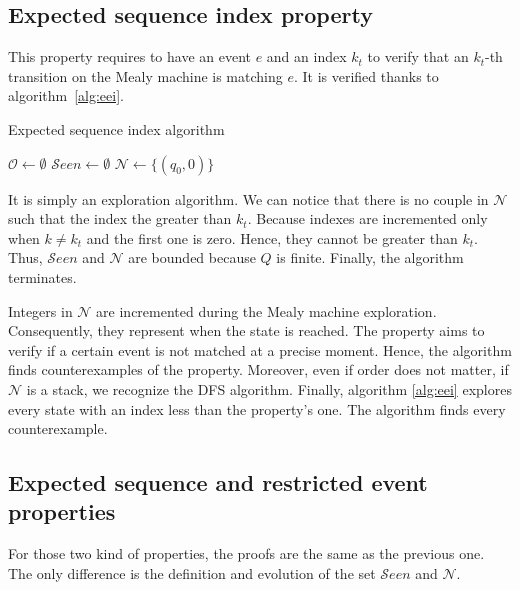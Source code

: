 \subsection{Expected sequence index property}
This property requires to have an event $e$ and an index $k_t$ to verify that an $k_t$-th transition on the Mealy machine is matching $e$.
It is verified thanks to algorithm~\ref*{alg:eei}.
\begin{algorithm}
    \caption{Expected sequence index algorithm}\label{alg:eei}
    $\mathcal{O}\gets \emptyset$\;
    $\mathcal{S}een\gets \emptyset$\;
    $\mathcal{N}\gets \{(q_0,0) \} $\;
\end{algorithm}

It is simply an exploration algorithm. 
We can notice that there is no couple in $\mathcal{N}$ such that the index the greater than $k_t$.
Because indexes are incremented only when $k\neq k_t$ and the first one is zero.
Hence, they cannot be greater than $k_t$. 
Thus, $\mathcal{S}een$ and $\mathcal{N}$ are bounded because $Q$ is finite.
Finally, the algorithm terminates.

Integers in $\mathcal{N}$ are incremented during the Mealy machine exploration.
Consequently, they represent when the state is reached. 
The property aims to verify if a certain event is not matched at a precise moment. 
Hence, the algorithm finds counterexamples of the property.
Moreover, even if order does not matter, if $\mathcal{N}$ is a stack, we recognize the DFS algorithm.
Finally, algorithm \ref*{alg:eei} explores every state with an index less than the property's one. 
The algorithm finds every counterexample.


\subsection{Expected sequence and restricted event properties}
For those two kind of properties, the proofs are the same as the previous one.
The only difference is the definition and evolution of the set $\mathcal{S}een$ and $\mathcal{N}$.

